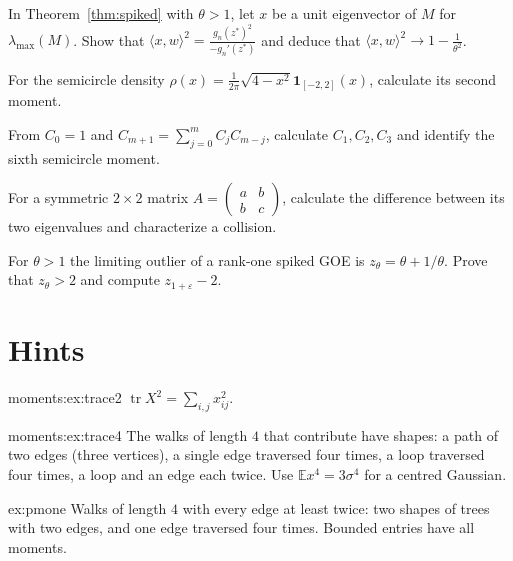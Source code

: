 \begin{exercise}[$\star\star\star$]\label{ex:overlap}
In Theorem~\ref{thm:spiked} with $\theta>1$, let $x$ be a unit eigenvector of $M$ for $\lambda_{\max}(M)$. Show that $\langle x,w\rangle^2=\frac{g_n(z^*)^2}{-g_n'(z^*)}$ and deduce that $\langle x,w\rangle^2\to1-\frac1{\theta^2}$.
\end{exercise}

\begin{exercise}[$\star$]\label{ex:v12scsecond}
For the semicircle density $\rho(x)=\frac1{2\pi}\sqrt{4-x^2}\mathbf1_{[-2,2]}(x)$, calculate its second moment.
\end{exercise}

\begin{exercise}[$\star$]\label{ex:v12catalan3}
From $C_0=1$ and $C_{m+1}=\sum_{j=0}^m C_jC_{m-j}$, calculate $C_1,C_2,C_3$ and identify the sixth semicircle moment.
\end{exercise}

\begin{exercise}[$\star\star$]\label{ex:v12twoeigengap}
For a symmetric $2\times2$ matrix $A=\begin{pmatrix}a&b\\b&c\end{pmatrix}$, calculate the difference between its two eigenvalues and characterize a collision.
\end{exercise}

\begin{exercise}[$\star\star\star$]\label{ex:v12spikeedge}
For $\theta>1$ the limiting outlier of a rank-one spiked GOE is $z_\theta=\theta+1/\theta$. Prove that $z_\theta>2$ and compute $z_{1+\varepsilon}-2$.
\end{exercise}

\section{Hints}
\begin{hint}{moments:ex:trace2}
$\operatorname{tr}X^2=\sum_{i,j}x_{ij}^2$.
\end{hint}
\begin{hint}{moments:ex:trace4}
The walks of length $4$ that contribute have shapes: a path of two edges (three vertices), a single edge traversed four times, a loop traversed four times, a loop and an edge each twice.
Use $\mathbb Ex^4=3\sigma^4$ for a centred Gaussian.
\end{hint}

\begin{hint}{ex:pmone}
Walks of length $4$ with every edge at least twice: two shapes of trees with two edges, and one edge traversed four times. Bounded entries have all moments.
\end{hint}

